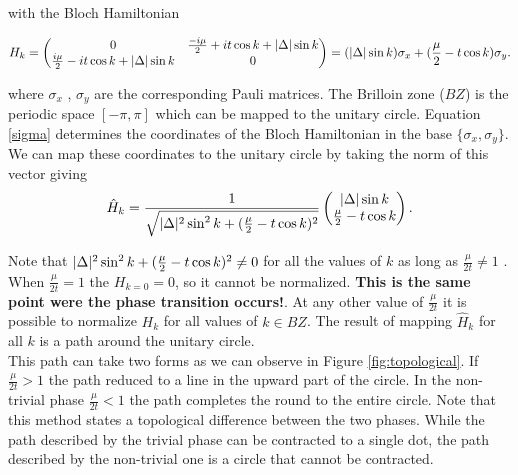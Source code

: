 with the Bloch Hamiltonian 

\begin{equation}
H_k = \begin{pmatrix} 
      0    &  \frac{-i \mu}{2} + it \cos k + \vert \Delta \vert  \sin k  \\ 
       \frac{i \mu}{2} - it \cos k + \vert \Delta \vert \sin k  &  0 
    \end{pmatrix}
    = (\vert \Delta \vert \sin k) \sigma_x + (\frac{\mu}{2}- t \cos k) \sigma_y.
\label{sigma}
\end{equation}




\noindent where $\sigma_x$ , $\sigma_y$ are the corresponding Pauli matrices. The Brilloin zone ($BZ$) is the periodic space  $[-\pi , \pi]$ which can be mapped to the unitary circle.   Equation \eqref{sigma} determines  the coordinates of the Bloch Hamiltonian in the base $\{\sigma_x, \sigma_y\}$. We can map these coordinates to the unitary circle by taking the norm of this vector giving
\begin{equation}
     \hat{H}_k= \frac{1}{\sqrt{\vert \Delta \vert^2 \sin^2 k + (\frac{\mu}{2}- t \cos k)^2}}
     \begin{pmatrix} 
      \vert \Delta \vert \sin k    \\ 
      \frac{\mu}{2}- t \cos k 
    \end{pmatrix}. 
\end{equation}

Note that $\vert \Delta \vert^2 \sin^2 k + (\frac{\mu}{2}- t \cos k)^2 \neq 0$ for all the values of $k$ as long as $\frac{\mu}{2t} \neq 1$ . When $\frac{\mu}{2t} = 1$ the $H_{k=0}=0$, so it cannot be normalized. \textbf{This is the same point were the phase transition occurs!}. At any other value of $\frac{\mu}{2t}$ it is possible to normalize $H_{k}$ for all values of $k\in BZ$. The result of mapping $\hat{H}_k$ for all $k$ is a path around the unitary circle. \\

This path can take two forms as we can observe in Figure \ref{fig:topological}. If $\frac{\mu}{2t} > 1$ the path reduced to a line in the upward part of the circle. In the non-trivial phase $\frac{\mu}{2t} < 1$ the path completes the round to the entire circle. Note that this method states a topological difference between the two phases. While the path described by the trivial phase can be contracted to a single dot, the path described by the non-trivial one is a circle that cannot be contracted. \\

